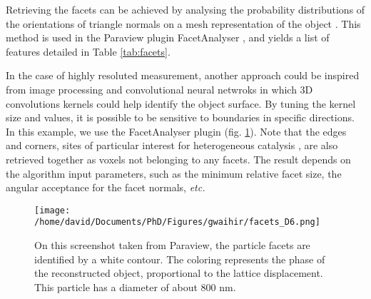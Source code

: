 Retrieving the facets can be achieved by analysing the probability distributions of the orientations of triangle normals on a mesh representation of the object \parencite{Grothausmann2012}.
This method is used in the Paraview plugin FacetAnalyser \parencite{Grothausmann_Beare2015}, and yields a list of features detailed in Table \ref{tab:facets}.

In the case of highly resoluted measurement, another approach could be inspired from  image processing and convolutional neural netwroks in which 3D convolutions kernels could help identify the object surface.
By tuning the kernel size and values, it is possible to be sensitive to boundaries in specific directions.
In this example, we use the FacetAnalyser plugin (fig. \ref{fig:facets_paraview}). Note that the edges and corners, sites of particular interest for heterogeneous catalysis \parencite{default_1925}, are also retrieved together as voxels not belonging to any facets.
The result depends on the algorithm input parameters, such as the minimum relative facet size, the angular acceptance for the facet normals, \textit{etc.}

\begin{figure}
    \centering
    \texttt{[image: /home/david/Documents/PhD/Figures/gwaihir/facets\_D6.png]}
    \caption{On this screenshot taken from Paraview, the particle facets are identified by a white contour. The coloring represents the phase of the reconstructed object, proportional to the lattice displacement. This particle has a diameter of about 800 nm.}
    \label{fig:facets_paraview}
\end{figure}

\begin{table}
    \begin{center}
    \end{center}
    \caption{The output of facet analysis is a list of values for each facet. The accessible features are the facet size, the average strain, the average displacement, the facet center and the facet normal. The uncertainty on the average displacement and strain corresponds to the standard deviation of  the displacement and strain distribution, respectively.}
    \label{tab:facets}
\end{table}{}


